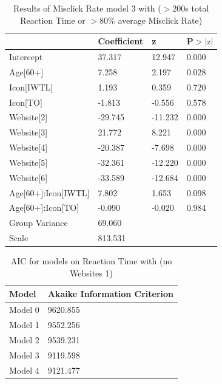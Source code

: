 \documentclass[12pt,twoside]{reedthesis}
\begin{document}
\begin{table}[h!]
        \centering
        \begin{tabular}{| p{5cm} | p{2.5cm} | p{2.5cm} | p{2.5cm} |}
            \hline
            & Coefficient & z & P$>|\text{z}|$\\
            \hline
            Intercept & 37.317 & 12.947 & 0.000\\
            \hline
            Age[60+] & 7.258  & 2.197 & 0.028\\
            \hline
            Icon[IWTL] & 1.193 & 0.359  & 0.720\\
            \hline
            Icon[TO] & -1.813 & -0.556 & 0.578\\
            \hline
            Website[2] & -29.745 & -11.232 & 0.000\\
            \hline
            Website[3] & 21.772 & 8.221 & 0.000\\
            \hline
            Website[4] & -20.387 & -7.698 & 0.000\\
            \hline
            Website[5] & -32.361 & -12.220 & 0.000\\
            \hline
            Website[6] & -33.589 & -12.684 & 0.000\\
            \hline
            Age[60+]:Icon[IWTL] & 7.802 & 1.653 & 0.098\\
            \hline
            Age[60+]:Icon[TO] & -0.090 & -0.020 & 0.984\\
            \hline
            Group Variance & 69.060 &&\\
            \hline
            Scale & 813.531 &&\\
            \hline
        \end{tabular}
        \caption{Results of Misclick Rate model 3 with ($>200$s total Reaction Time or $>80$\% average Misclick Rate)}
    \end{table} 

\begin{table}[h!]
        \centering
        \begin{tabular}{| p{3.5cm} | p{7.5cm} |}
            \hline
            Model & Akaike Information Criterion\\
            \hline
            Model 0 & 9620.855\\
            \hline
            Model 1 & 9552.256\\
            \hline
            Model 2 & 9539.231\\
            \hline
            Model 3 & 9119.598\\
            \hline
            Model 4 & 9121.477\\
            \hline
        \end{tabular}
        \caption{AIC for models on Reaction Time with (no Websites 1)}
    \end{table}
\end{document}
